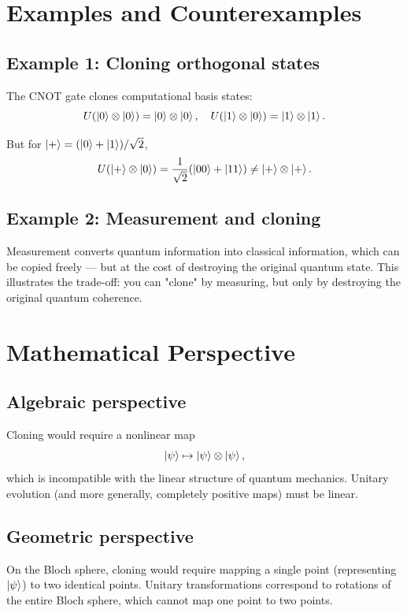 \documentclass[12pt]{article}
\newcommand{\tensor}{\otimes}
\begin{document}
\section{Examples and Counterexamples}

\subsection{Example 1: Cloning orthogonal states}

The CNOT gate clones computational basis states:
\[
U(\ket{0}\tensor\ket{0}) = \ket{0}\tensor\ket{0}, \quad
U(\ket{1}\tensor\ket{0}) = \ket{1}\tensor\ket{1}.
\]

But for $\ket{+} = (\ket{0} + \ket{1})/\sqrt{2}$,
\[
U(\ket{+}\tensor\ket{0}) = \frac{1}{\sqrt{2}}(\ket{00} + \ket{11}) \neq \ket{+}\tensor\ket{+}.
\]

\subsection{Example 2: Measurement and cloning}

Measurement converts quantum information into classical information, which can be copied freely — but at the cost of destroying the original quantum state. This illustrates the trade-off: you can "clone" by measuring, but only by destroying the original quantum coherence.

\section{Mathematical Perspective}

\subsection{Algebraic perspective}

Cloning would require a nonlinear map
\[
\ket{\psi} \mapsto \ket{\psi} \tensor \ket{\psi},
\]
which is incompatible with the linear structure of quantum mechanics. Unitary evolution (and more generally, completely positive maps) must be linear.

\subsection{Geometric perspective}

On the Bloch sphere, cloning would require mapping a single point (representing $\ket{\psi}$) to two identical points. Unitary transformations correspond to rotations of the entire Bloch sphere, which cannot map one point to two points.
\end{document}

